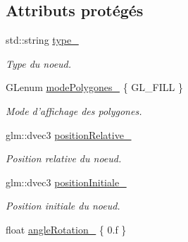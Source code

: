\subsection*{Attributs protégés}
\begin{DoxyCompactItemize}
\item 
\hypertarget{class_noeud_abstrait_ad53da47a60f4b4fbbd400234cbdcb06b}{std\-::string \hyperlink{class_noeud_abstrait_ad53da47a60f4b4fbbd400234cbdcb06b}{type\-\_\-}}\label{class_noeud_abstrait_ad53da47a60f4b4fbbd400234cbdcb06b}

\begin{DoxyCompactList}\small\item\em Type du noeud. \end{DoxyCompactList}\item 
\hypertarget{class_noeud_abstrait_aa2b57eeb848bc8cb48562788daf81d3e}{G\-Lenum \hyperlink{class_noeud_abstrait_aa2b57eeb848bc8cb48562788daf81d3e}{mode\-Polygones\-\_\-} \{ G\-L\-\_\-\-F\-I\-L\-L \}}\label{class_noeud_abstrait_aa2b57eeb848bc8cb48562788daf81d3e}

\begin{DoxyCompactList}\small\item\em Mode d'affichage des polygones. \end{DoxyCompactList}\item 
\hypertarget{class_noeud_abstrait_ae8a50095413ac131cd6d07a384a9ff5d}{glm\-::dvec3 \hyperlink{class_noeud_abstrait_ae8a50095413ac131cd6d07a384a9ff5d}{position\-Relative\-\_\-}}\label{class_noeud_abstrait_ae8a50095413ac131cd6d07a384a9ff5d}

\begin{DoxyCompactList}\small\item\em Position relative du noeud. \end{DoxyCompactList}\item 
\hypertarget{class_noeud_abstrait_a9ac4861933dc8eedb4f5abe6cdc934b8}{glm\-::dvec3 \hyperlink{class_noeud_abstrait_a9ac4861933dc8eedb4f5abe6cdc934b8}{position\-Initiale\-\_\-}}\label{class_noeud_abstrait_a9ac4861933dc8eedb4f5abe6cdc934b8}

\begin{DoxyCompactList}\small\item\em Position initiale du noeud. \end{DoxyCompactList}\item 
\hypertarget{class_noeud_abstrait_a69f867797b7cdc93fbcb5b4d9ae3deee}{float \hyperlink{class_noeud_abstrait_a69f867797b7cdc93fbcb5b4d9ae3deee}{angle\-Rotation\-\_\-} \{ 0.f \}}\label{class_noeud_abstrait_a69f867797b7cdc93fbcb5b4d9ae3deee}


\end{DoxyCompactItemize}
